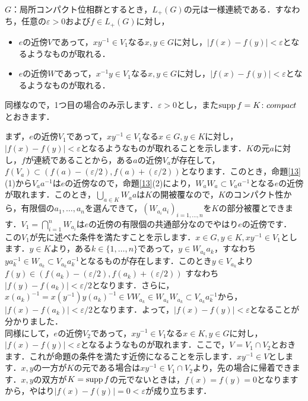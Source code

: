 \begin{yprop}\label{16}
$G$：局所コンパクト位相群とするとき，$L_{+}(G)$の元は一様連続である．すなわち，任意の$\varepsilon>0$および$f \in L_{+}(G)$に対し，
\begin{itemize}
 \item $e$の近傍$V$であって，$xy^{-1} \in V_1$なる$x, y \in G$に対し，$|f(x)-f(y)|<\varepsilon$となるようなものが取れる．
 \item $e$の近傍$W$であって，$x^{-1}y \in V_1$なる$x, y \in G$に対し，$|f(x)-f(y)|<\varepsilon$となるようなものが取れる．
\end{itemize}
\end{yprop}
\begin{Proof}
同様なので，1つ目の場合のみ示します．$\varepsilon>0$とし，また$\operatorname{supp} f=K \colon compact$とおきます．

まず，$e$の近傍$V_1$であって，$xy^{-1} \in V_1$なる$x \in G, y \in K$に対し，$|f(x)-f(y)|<\varepsilon$となるようなものが取れることを示します．$K$の元$a$に対し，$f$が連続であることから，ある$a$の近傍$V_a$が存在して，$f(V_a) \subset (f(a)-(\varepsilon /2), f(a)+(\varepsilon /2) )$となります．このとき，命題\ref{13}(1)から$V_{a}a^{-1}$は$e$の近傍なので，命題\ref{13}(2)により，$W_{a}W_{a} \subset V_{a}a^{-1}$となる$e$の近傍が取れます．このとき，$\bigcup_{a \in K}{W_a}a$は$K$の開被覆なので，$K$のコンパクト性から，有限個の$a_1, \ldots, a_n$を選んできて，$( W_{a_i}a_{i} )_{i=1,\ldots,n}$を$K$の部分被覆とできます．$V_1=\bigcap_{i=1}^{n}W_{a_i}$は$e$の近傍の有限個の共通部分なのでやはり$e$の近傍です．\\

この$V_1$が先に述べた条件を満たすことを示します．$x \in G, y \in K, xy^{-1} \in V_1$とします．$y \in K$より，ある$k \in \{1, \ldots , n \}$であって，$y \in W_{a_k}a_{k}$，すなわち$ya_{k}^{-1} \in W_{a_k} \subset V_{a_k}a_{k}^{-1}$となるものが存在します．このとき$y \in V_{a_k}$より$f(y) \in (f(a_k)-(\varepsilon/2), f(a_k)+(\varepsilon /2) )$ すなわち $|f(y)-f(a_k)|<\varepsilon /2$となります．さらに，$x(a_k)^{-1}=x(y^{-1})y(a_k)^{-1} \in VW_{a_k} \in W_{a_k}W_{a_k} \subset V_{a_k}a_{k}^{-1}$から，$|f(x)-f(a_k)|<\varepsilon /2$となります．よって，$|f(x)-f(y)|<\varepsilon$となることが分かりました．\\

同様にして，$e$の近傍$V_2$であって，$xy^{-1} \in V_1$なる$x \in K, y \in G$に対し，$|f(x)-f(y)|<\varepsilon$となるようなものが取れます．ここで，$V=V_1 \cap V_2$とおきます．これが命題の条件を満たす近傍になることを示します．$xy^{-1} \in V$とします．$x,y$の一方が$K$の元である場合は$xy^{-1} \in V_1 \cap V_2$より，先の場合に帰着できます．$x,y$の双方が$K=\operatorname{supp} f$の元でないときは，$f(x)=f(y)=0$となりますから，やはり$|f(x)-f(y)|=0<\varepsilon$が成り立ちます．　
\end{Proof}


